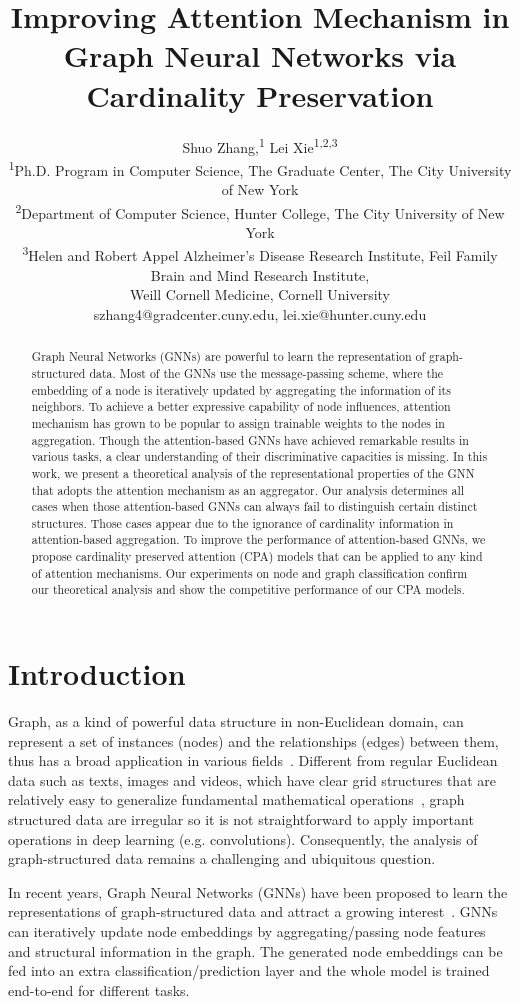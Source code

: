\documentclass[letterpaper]{article} \usepackage{aaai20}  \usepackage{times}  \usepackage{helvet} \usepackage{courier}  \usepackage[hyphens]{url}  \usepackage{graphicx} \urlstyle{rm} \def\UrlFont{\rm}  \usepackage{graphicx}  \frenchspacing  \setlength{\pdfpagewidth}{8.5in}  \setlength{\pdfpageheight}{11in}
\title{Improving Attention Mechanism in Graph Neural Networks via Cardinality Preservation}
\author{
Shuo Zhang,\textsuperscript{1} Lei Xie\textsuperscript{1,2,3} \\
\textsuperscript{1}Ph.D. Program in Computer Science, The Graduate Center, The City University of New York \\
\textsuperscript{2}Department of Computer Science, Hunter College, The City University of New York \\
\textsuperscript{3}Helen and Robert Appel Alzheimer’s Disease Research Institute, Feil Family Brain and Mind Research Institute, \\Weill Cornell Medicine, Cornell University \\
szhang4@gradcenter.cuny.edu, lei.xie@hunter.cuny.edu \\
}
\theoremstyle{plain}
\theoremstyle{definition}
\begin{document}
\maketitle

\begin{abstract}
Graph Neural Networks (GNNs) are powerful to learn the representation of graph-structured data. Most of the GNNs use the message-passing scheme, where the embedding of a node is iteratively updated by aggregating the information of its neighbors. To achieve a better expressive capability of node influences, attention mechanism has grown to be popular to assign trainable weights to the nodes in aggregation. Though the attention-based GNNs have achieved remarkable results in various tasks, a clear understanding of their discriminative capacities is missing. In this work, we present a theoretical analysis of the representational properties of the GNN that adopts the attention mechanism as an aggregator. Our analysis determines all cases when those attention-based GNNs can always fail to distinguish certain distinct structures. Those cases appear due to the ignorance of cardinality information in attention-based aggregation. To improve the performance of attention-based GNNs, we propose cardinality preserved attention (CPA) models that can be applied to any kind of attention mechanisms. Our experiments on node and graph classification confirm our theoretical analysis and show the competitive performance of our CPA models.

\end{abstract}

\section{Introduction}
Graph, as a kind of powerful data structure in non-Euclidean domain, can represent a set of instances (nodes) and the relationships (edges) between them, thus has a broad application in various fields~\cite{zhou2018graph}. Different from regular Euclidean data such as texts, images and videos, which have clear grid structures that are relatively easy to generalize fundamental mathematical operations~\cite{shuman2013emerging}, graph structured data are irregular so it is not straightforward to apply important operations in deep learning (e.g. convolutions). Consequently, the analysis of graph-structured data remains a challenging and ubiquitous question.

In recent years, Graph Neural Networks (GNNs) have been proposed to learn the representations of graph-structured data and attract a growing interest~\cite{scarselli2009graph,li2015gated,duvenaud2015convolutional,niepert2016learning,kipf2017semi,hamilton2017inductive,zhang2018end,ying2018hierarchical,morris2018weisfeiler,xu2018how}. GNNs can iteratively update node embeddings by aggregating/passing node features and structural information in the graph. The generated node embeddings can be fed into an extra classification/prediction layer and the whole model is trained end-to-end for different tasks.
\end{document}
